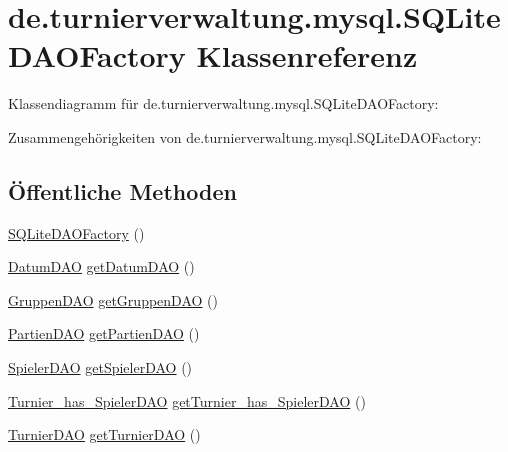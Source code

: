 \hypertarget{classde_1_1turnierverwaltung_1_1mysql_1_1_s_q_lite_d_a_o_factory}{}\section{de.\+turnierverwaltung.\+mysql.\+S\+Q\+Lite\+D\+A\+O\+Factory Klassenreferenz}
\label{classde_1_1turnierverwaltung_1_1mysql_1_1_s_q_lite_d_a_o_factory}


Klassendiagramm für de.\+turnierverwaltung.\+mysql.\+S\+Q\+Lite\+D\+A\+O\+Factory\+:


Zusammengehörigkeiten von de.\+turnierverwaltung.\+mysql.\+S\+Q\+Lite\+D\+A\+O\+Factory\+:
\subsection*{Öffentliche Methoden}
\begin{DoxyCompactItemize}
\item 
\hyperlink{classde_1_1turnierverwaltung_1_1mysql_1_1_s_q_lite_d_a_o_factory_a1cf4efba6363acd5ccadae56cb3758e7}{S\+Q\+Lite\+D\+A\+O\+Factory} ()
\item 
\hyperlink{interfacede_1_1turnierverwaltung_1_1mysql_1_1_datum_d_a_o}{Datum\+D\+AO} \hyperlink{classde_1_1turnierverwaltung_1_1mysql_1_1_s_q_lite_d_a_o_factory_af6cfda6587e5132735c1f5dc517a44bb}{get\+Datum\+D\+AO} ()
\item 
\hyperlink{interfacede_1_1turnierverwaltung_1_1mysql_1_1_gruppen_d_a_o}{Gruppen\+D\+AO} \hyperlink{classde_1_1turnierverwaltung_1_1mysql_1_1_s_q_lite_d_a_o_factory_acdffd3d34c6f5b6c4210a2290a33d548}{get\+Gruppen\+D\+AO} ()
\item 
\hyperlink{interfacede_1_1turnierverwaltung_1_1mysql_1_1_partien_d_a_o}{Partien\+D\+AO} \hyperlink{classde_1_1turnierverwaltung_1_1mysql_1_1_s_q_lite_d_a_o_factory_a1298e01af514501b6288bc11ab0458dd}{get\+Partien\+D\+AO} ()
\item 
\hyperlink{interfacede_1_1turnierverwaltung_1_1mysql_1_1_spieler_d_a_o}{Spieler\+D\+AO} \hyperlink{classde_1_1turnierverwaltung_1_1mysql_1_1_s_q_lite_d_a_o_factory_a1cbbccfb5223dd5f9a25420c0bc3e997}{get\+Spieler\+D\+AO} ()
\item 
\hyperlink{interfacede_1_1turnierverwaltung_1_1mysql_1_1_turnier__has___spieler_d_a_o}{Turnier\+\_\+has\+\_\+\+Spieler\+D\+AO} \hyperlink{classde_1_1turnierverwaltung_1_1mysql_1_1_s_q_lite_d_a_o_factory_a2ed6ab7e17281ec21ef4095d30163a38}{get\+Turnier\+\_\+has\+\_\+\+Spieler\+D\+AO} ()
\item 
\hyperlink{interfacede_1_1turnierverwaltung_1_1mysql_1_1_turnier_d_a_o}{Turnier\+D\+AO} \hyperlink{classde_1_1turnierverwaltung_1_1mysql_1_1_s_q_lite_d_a_o_factory_aa15d6313d331eebd7e55ba104480d3bf}{get\+Turnier\+D\+AO} ()
\end{DoxyCompactItemize}
